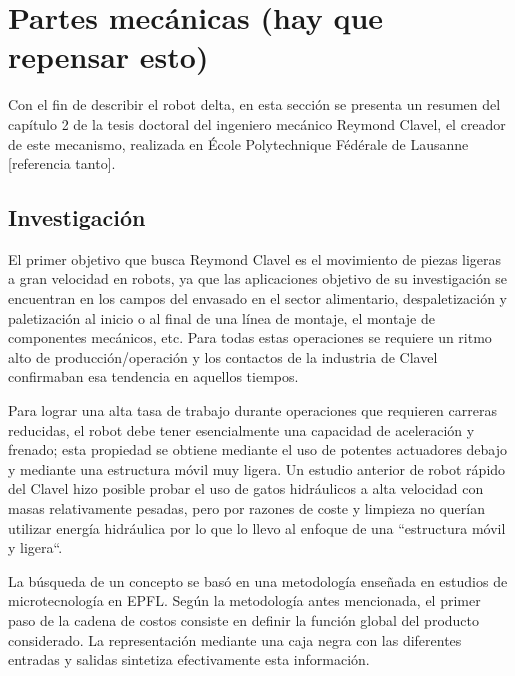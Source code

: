     

    
\section{Partes mecánicas (hay que repensar esto)}
    Con el fin de describir el robot delta, en esta sección se presenta un resumen del capítulo 2 de la tesis doctoral del ingeniero mecánico Reymond Clavel, el creador de este mecanismo, realizada en École Polytechnique Fédérale de Lausanne [referencia tanto]. 

    
    \subsection{Investigación}
    El primer objetivo que busca Reymond Clavel es el movimiento de piezas ligeras a gran velocidad en robots, ya que las aplicaciones objetivo de su investigación se encuentran en los campos del envasado en el sector alimentario, despaletización y paletización al inicio o al final de una línea de montaje, el montaje de componentes mecánicos, etc. Para todas estas operaciones se requiere un ritmo alto de producción/operación y los contactos de la industria de Clavel confirmaban esa tendencia en aquellos tiempos.
    
    Para lograr una alta tasa de trabajo durante operaciones que requieren carreras reducidas, el robot debe tener esencialmente una capacidad de aceleración y frenado; esta propiedad se obtiene mediante el uso de potentes actuadores debajo y mediante una estructura móvil muy ligera. Un estudio anterior de robot rápido del Clavel hizo posible probar el uso de gatos hidráulicos a alta velocidad con masas relativamente pesadas, pero por razones de coste y limpieza no querían utilizar energía hidráulica por lo que lo llevo al enfoque de una ``estructura móvil y ligera``.
    
    La búsqueda de un concepto se basó en una metodología enseñada en estudios de microtecnología en EPFL. Según la metodología antes mencionada, el primer paso de la cadena de costos consiste en definir la función global del producto considerado. La representación mediante una caja negra con las diferentes entradas y salidas sintetiza efectivamente esta información.
    
